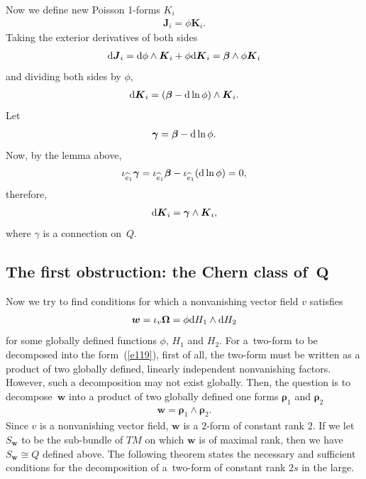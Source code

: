 \documentclass[10pt,a4paper]{amsart}
\numberwithin{equation}{section}
\begin{document}
Now we def\/ine new Poisson 1-forms $K_{i}$
\begin{gather*}
\boldsymbol{J}_{i}=\phi \boldsymbol{K}_{i}.
\end{gather*}
Taking the exterior derivatives of both sides
\begin{gather*}
{\rm d}\boldsymbol{J}_{i}={\rm d}\phi \wedge \boldsymbol{K}_{i}+\phi {\rm d}\boldsymbol{K}_{i}=\boldsymbol{\beta }\wedge \phi \boldsymbol{K}_{i}
\end{gather*}
and dividing both sides by $\phi $,
\begin{gather*}
{\rm d}\boldsymbol{K}_{i}= ( \boldsymbol{\beta }-{\rm d}\ln \phi ) \wedge \boldsymbol{K}_{i}.
\end{gather*}
Let
\begin{gather*}
\boldsymbol{\gamma }=\boldsymbol{\beta }-{\rm d}\ln \phi.
\end{gather*}
Now, by the lemma above,
\begin{gather}
\iota _{\widehat{e}_{1}}\boldsymbol{\gamma }=\iota _{\widehat{e}_{1}}\boldsymbol{\beta }-\iota _{\widehat{e}_{1}} ( {\rm d}\ln \phi ) =0, \label{e117}
\end{gather}
therefore,
\begin{gather}
{\rm d}\boldsymbol{K}_{i}=\boldsymbol{\gamma }\wedge \boldsymbol{K}_{i}, \label{e118}
\end{gather}
where $\gamma $ is a connection on~$Q$.

\subsection[The f\/irst obstruction: the Chern class of $Q$]{The f\/irst obstruction: the Chern class of~$\boldsymbol{Q}$}\label{section3.2}

Now we try to f\/ind conditions for which a nonvanishing vector f\/ield $v$ satisf\/ies
\begin{gather}
\boldsymbol{w}=\iota _{v}\boldsymbol{\Omega }=\phi {\rm d}H_{1}\wedge {\rm d}H_{2} \label{e119}
\end{gather}
for some globally def\/ined functions $\phi $, $H_{1}$ and $H_{2}$. For a~two-form to be decomposed into the form~(\ref{e119}), f\/irst of all, the two-form must be written as a product of two globally def\/ined, linearly independent nonvanishing factors. However, such a decomposition may not exist globally. Then, the question is to decompose~$\boldsymbol{w}$ into a product of two globally def\/ined one forms $\boldsymbol{\rho }_{1}$ and $\boldsymbol{\rho }_{2}$
\begin{gather}
\boldsymbol{w}=\boldsymbol{\rho }_{1}\wedge \boldsymbol{\rho }_{2}. \label{e123}
\end{gather}
Since $v$ is a nonvanishing vector f\/ield, $\boldsymbol{w}$ is a $2$-form of constant rank $2$. If we let $S_{\boldsymbol{w}}$ to be the sub-bundle of $TM$ on which $\boldsymbol{w}$ is of maximal rank, then we have $S_{\boldsymbol{w}}\cong Q $ def\/ined above. The following theorem states the necessary and suf\/f\/icient conditions for the decomposition of a~two-form of constant rank $2s$ in the large.
\end{document}
